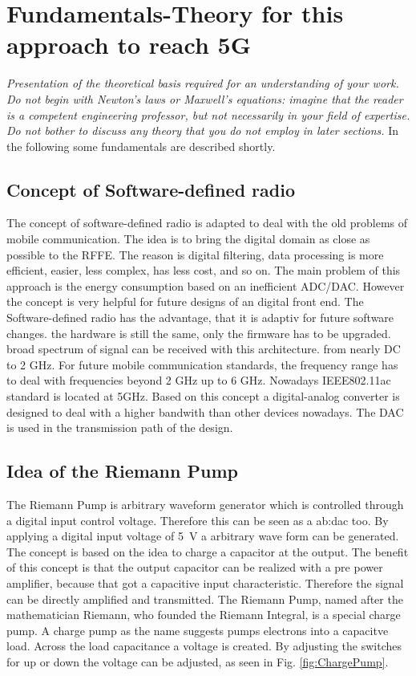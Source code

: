 \chapter{Fundamentals-Theory for this approach to reach 5G}
\label{ch:fundamentals}
\textit{Presentation of the theoretical basis required for an understanding of your work. Do not begin with Newton's laws or Maxwell's equations: imagine that the reader is a competent engineering professor, but not necessarily in your field of expertise. Do not bother to discuss any theory that you do not employ in later sections.}
In the following some fundamentals are described shortly.
\section{Concept of Software-defined radio}
The concept of software-defined radio is adapted to deal with the old problems of mobile communication. The idea is to bring the digital domain as close as possible to the RFFE. The reason is digital filtering, data processing is more efficient, easier, less complex, has less cost, and so on. The main problem of this approach is the energy consumption based on an inefficient ADC/DAC. However the concept is very helpful for future designs of an digital front end. The Software-defined radio has the advantage, that it is adaptiv for future software changes. the hardware is still the same, only the firmware has to be upgraded. broad spectrum of signal can be received with this architecture. from nearly DC to 2 GHz. For future mobile communication standards, the frequency range has to deal with frequencies beyond 2 GHz up to 6 GHz. Nowadays IEEE802.11ac standard is located at 5GHz. Based on this concept a digital-analog converter is designed to deal with a higher bandwith than other devices nowadays. The DAC is used in the transmission path of the design.
\section{Idea of the Riemann Pump}
The Riemann Pump is arbitrary waveform generator which is controlled through a digital input control voltage.
Therefore this can be seen as a \gls{ab:dac} too.
By applying a digital input voltage of \SI{5}{\volt} a arbitrary wave form can be generated.
The concept is based on the idea to charge a capacitor at the output.
The benefit of this concept is that the output capacitor can be realized with a pre power amplifier, because that got a capacitive input characteristic.
Therefore the signal can be directly amplified and transmitted.
The Riemann Pump, named after the mathematician Riemann, who founded the Riemann Integral, is a special charge pump. A charge pump as the name suggests pumps electrons into a capacitve load. Across the load capacitance a voltage is created. By adjusting the switches for up or down the voltage can be adjusted, as seen in Fig. \ref{fig:ChargePump}. 

